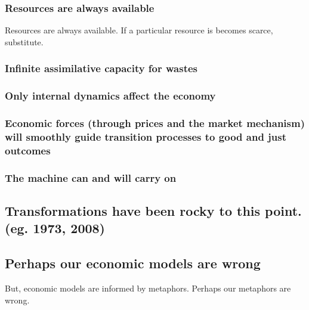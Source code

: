\subsubsection{Resources are always available}
\label{sec:infinite_resources}

Resources are always available.  If a particular resource is becomes scarce, substitute.

\subsubsection{Infinite assimilative capacity for wastes}
\label{sec:infinite_waste}

\subsubsection{Only internal dynamics affect the economy}
\label{sec:internal_dynamics}

\subsubsection{Economic forces (through prices and the market mechanism) will smoothly guide transition processes to good and just outcomes}
\label{sec:economic_forces}


\subsubsection{The machine can and will carry on}
\label{sec:machine_endures}

\subsection{Transformations have been rocky to this point. (eg. 1973, 2008)}
\label{sec:transformations}

\subsection{Perhaps our economic models are wrong}
\label{sec:wrong_models}

But, economic models are informed by metaphors. Perhaps our metaphors are wrong.


